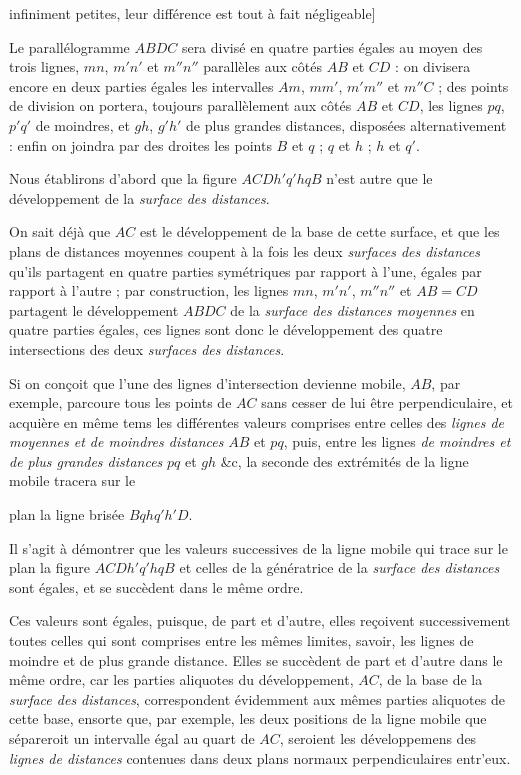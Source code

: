 \documentclass[11pt,a4paper]{article}
\begin{document}
infiniment petites, leur différence est tout à fait négligeable]

Le parallélogramme $ABDC$ sera divisé en quatre parties égales au moyen des
trois lignes, $mn$, $m'n'$ et $m''n''$ parallèles aux côtés $AB$ et $CD$ :
on divisera encore en deux parties égales les intervalles $Am$, $mm'$,
$m'm''$ et $m''C$ ; des points de division on portera, toujours
parallèlement aux côtés $AB$ et $CD$, les lignes $pq$, $p'q'$ de moindres,
et $gh$, $g'h'$ de plus grandes distances, disposées alternativement :
enfin on joindra par des droites les points $B$ et $q$ ; $q$ et $h$ ; $h$ et
$q'$.


Nous établirons d'abord que la figure $ACDh'q'hqB$ n'est autre que le
développement de la \emph{surface des distances}.

On sait déjà que $AC$ est le développement de la base de cette surface, et
que les plans de distances moyennes coupent à la fois les deux
\emph{surfaces des distances} qu'ils partagent en quatre parties symétriques
par rapport à l'une, égales par rapport à l'autre ; par construction, les
lignes $mn$, $m'n'$, $m''n''$ et $AB = CD$ partagent le développement
$ABDC$ de la \emph{surface des distances moyennes} en quatre parties égales,
ces lignes sont donc le développement des quatre intersections des deux
\emph{surfaces des distances}.

Si on conçoit que l'une des lignes d'intersection devienne mobile, $AB$, par
exemple, parcoure tous les points de $AC$ sans cesser de lui être
perpendiculaire, et acquière en même tems les différentes valeurs comprises
entre celles des \emph{lignes de moyennes et de moindres distances} $AB$ et
$pq$, puis, entre les lignes \emph{de moindres et de plus grandes
distances} $pq$ et $gh$ \&c, la seconde des extrémités de la ligne mobile
tracera sur le

plan la ligne brisée $Bqhq'h'D$.

Il s'agit à démontrer que les valeurs successives de la ligne mobile qui
trace sur le plan la figure $ACDh'q'hqB$ et celles de la génératrice de la
\emph{surface des distances} sont égales, et se succèdent dans le même
ordre.


Ces valeurs sont égales, puisque, de part et d'autre, elles reçoivent
successivement toutes celles qui sont comprises entre les mêmes limites,
savoir, les lignes de moindre et de plus grande distance. Elles se
succèdent de part et d'autre dans le même ordre, car les parties aliquotes
du développement, $AC$, de la base de la \emph{surface des distances},
correspondent évidemment aux mêmes parties aliquotes de cette base, ensorte
que, par exemple, les deux positions de la ligne mobile que sépareroit un
intervalle égal au quart de $AC$, seroient les développemens des
\emph{lignes de distances} contenues dans deux plans normaux
perpendiculaires entr'eux.
\end{document}
